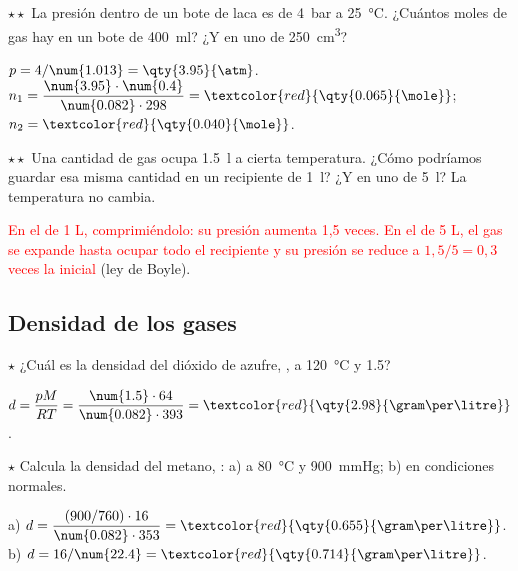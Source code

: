 \begin{exercise}
    \(\star\star\) La presión dentro de un bote de laca es de \qty{4}{\bar} a \qty{25}{\degreeCelsius}. ¿Cuántos moles de gas hay en un bote de
    \qty{400}{\milli\litre}? ¿Y en uno de \qty{250}{\cubic\centi\metre}?
    \begin{solu}
        \(p = 4/\num{1.013} = \qty{3.95}{\atm}\). \(n_1 = \dfrac{\num{3.95} \cdot \num{0.4}}{\num{0.082} \cdot 298} = \textcolor{red}{\qty{0.065}{\mole}}\);
        \(n_2 = \textcolor{red}{\qty{0.040}{\mole}}\).
    \end{solu}
\end{exercise}

\begin{exercise}
    \(\star\star\) Una cantidad de gas ocupa \qty{1.5}{\litre} a cierta temperatura. ¿Cómo podríamos guardar esa misma cantidad en un
    recipiente de \qty{1}{\litre}? ¿Y en uno de \qty{5}{\litre}? La temperatura no cambia.
    \begin{solu}
        \textcolor{red}{En el de 1 L, comprimiéndolo: su presión aumenta 1,5 veces. En el de 5 L, el gas se expande hasta ocupar todo el
        recipiente y su presión se reduce a \(1{,}5/5 = 0{,}3\) veces la inicial} (ley de Boyle).
    \end{solu}
\end{exercise}

\subsection{Densidad de los gases}

\begin{exercise}
    \(\star\) ¿Cuál es la densidad del dióxido de azufre, , a \qty{120}{\degreeCelsius} y \qty{1.5}{\atm}?
    \begin{solu}
        \(d = \dfrac{p M}{R T} = \dfrac{\num{1.5} \cdot 64}{\num{0.082} \cdot 393} = \textcolor{red}{\qty{2.98}{\gram\per\litre}}\).
    \end{solu}
\end{exercise}

\begin{exercise}
    \(\star\) Calcula la densidad del metano, : a) a \qty{80}{\degreeCelsius} y \qty{900}{\mmHg}; b) en condiciones normales.
    \begin{solu}
        a) \(d = \dfrac{(900/760) \cdot 16}{\num{0.082} \cdot 353} = \textcolor{red}{\qty{0.655}{\gram\per\litre}}\).
        b) \(d = 16/\num{22.4} = \textcolor{red}{\qty{0.714}{\gram\per\litre}}\).
    \end{solu}
\end{exercise}


